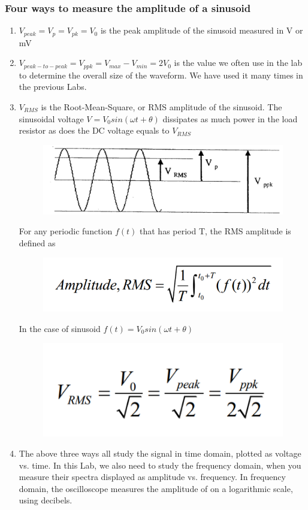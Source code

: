 \documentclass{article}
\begin{document}
\subsubsection{Four ways to measure the amplitude of a sinusoid}
\begin{enumerate}
	\item $V_{peak}=V_{p}=V_{pk}=V_0$ is the peak amplitude of the sinusoid measured in V or mV
	\item $V_{peak-to-peak}=V_{ppk}=V_{max}-V_{min}=2V_0$ is the value we often use in the lab to
	determine the overall size of the waveform. We have used it many times in the previous Labs.
	\item $V_{RMS}$ is the Root-Mean-Square, or RMS amplitude of the sinusoid. The
	sinusoidal voltage $V=V_0sin(\omega t+\theta)$ dissipates as much power in the load resistor
	as does the DC voltage equals to $V_{RMS}$
	\begin{figure}[H]
		\centering
		\includegraphics[width=0.7\linewidth]{p12}
		\label{fig:p12}
	\end{figure}
	For any periodic function $f(t)$ that has period T, the RMS amplitude is defined as
	\begin{figure}[H]
		\centering
		\includegraphics[width=0.4\linewidth]{p13}
		\label{fig:p13}
	\end{figure}
In the case of sinusoid $f(t)=V_0sin(\omega t+\theta)$
\begin{figure}[H]
	\centering
	\includegraphics[width=0.3\linewidth]{p14}
	\label{fig:p14}
\end{figure}
\item The above three ways all study the signal in time domain, plotted as voltage vs.
time. In this Lab, we also need to study the frequency domain, when you measure
their spectra displayed as amplitude vs. frequency. In frequency domain, the
oscilloscope measures the amplitude of on a logarithmic scale, using decibels.

\end{enumerate}
\end{document}
